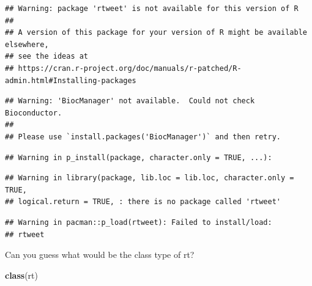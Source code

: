 \documentclass[
]{book}
\newenvironment{Shaded}{\begin{snugshade}}{\end{snugshade}}
\newcommand{\AttributeTok}[1]{\textcolor[rgb]{0.13,0.29,0.53}{#1}}
\newcommand{\CommentTok}[1]{\textcolor[rgb]{0.56,0.35,0.01}{\textit{#1}}}
\newcommand{\ConstantTok}[1]{\textcolor[rgb]{0.56,0.35,0.01}{#1}}
\newcommand{\DecValTok}[1]{\textcolor[rgb]{0.00,0.00,0.81}{#1}}
\newcommand{\FunctionTok}[1]{\textcolor[rgb]{0.13,0.29,0.53}{\textbf{#1}}}
\newcommand{\NormalTok}[1]{#1}
\newcommand{\OtherTok}[1]{\textcolor[rgb]{0.56,0.35,0.01}{#1}}
\newcommand{\SpecialCharTok}[1]{\textcolor[rgb]{0.81,0.36,0.00}{\textbf{#1}}}
\newcommand{\StringTok}[1]{\textcolor[rgb]{0.31,0.60,0.02}{#1}}
\begin{document}
\begin{verbatim}
## Warning: package 'rtweet' is not available for this version of R
## 
## A version of this package for your version of R might be available elsewhere,
## see the ideas at
## https://cran.r-project.org/doc/manuals/r-patched/R-admin.html#Installing-packages
\end{verbatim}

\begin{verbatim}
## Warning: 'BiocManager' not available.  Could not check Bioconductor.
## 
## Please use `install.packages('BiocManager')` and then retry.
\end{verbatim}

\begin{verbatim}
## Warning in p_install(package, character.only = TRUE, ...):
\end{verbatim}

\begin{verbatim}
## Warning in library(package, lib.loc = lib.loc, character.only = TRUE,
## logical.return = TRUE, : there is no package called 'rtweet'
\end{verbatim}

\begin{verbatim}
## Warning in pacman::p_load(rtweet): Failed to install/load:
## rtweet
\end{verbatim}

\begin{Shaded}
\end{Shaded}

Can you guess what would be the class type of rt?

\begin{Shaded}
\begin{Highlighting}[]
\FunctionTok{class}\NormalTok{(rt)}
\end{Highlighting}
\end{Shaded}
\end{document}
